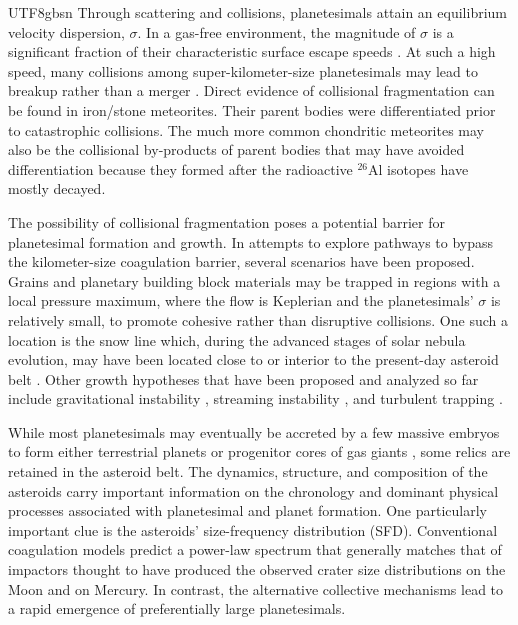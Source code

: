 \documentclass[tighten]{aastex6}
\begin{document}
\begin{CJK*}{UTF8}{gbsn}
Through scattering and collisions, planetesimals attain an 
equilibrium velocity dispersion, $\sigma$. In a gas-free environment,
the magnitude of $\sigma$ is a significant fraction of their 
characteristic surface escape speeds \citep{aarseth1993,palmer1993,  
kokuboida1998}.  At such a high speed, many collisions among 
super-kilometer-size planetesimals may lead to breakup rather 
than a merger \citep{agnor2004, leinhardt2012, stewart2012}. 
Direct evidence of collisional fragmentation can be found 
in iron/stone meteorites. Their parent bodies were 
differentiated prior to catastrophic collisions. The 
much more common chondritic meteorites may also be the 
collisional by-products of parent bodies that may have 
avoided differentiation because they formed after the 
radioactive $^{26}$Al isotopes have mostly decayed.

The possibility of collisional fragmentation poses a
potential barrier for planetesimal formation and growth.
In attempts to explore pathways to bypass the kilometer-size coagulation 
barrier, several scenarios have been proposed. Grains and 
planetary building block materials may be trapped in regions
with a local pressure maximum, where the flow is Keplerian
and the planetesimals' $\sigma$ is relatively small, to promote 
cohesive rather than disruptive collisions.  One such a 
location is the snow line \citep{kretke2007,brauer2008}
which, during the advanced stages of solar nebula evolution,
may have been located close to or interior to the present-day asteroid belt
\citep{garaudlin2007}. Other growth hypotheses that have been proposed 
and analyzed so far include gravitational instability 
\citep{goldreichward1973, weidenschillingcuzzi1993, youdinshu2002, 
garaudlin2004}, streaming instability \citep{youdingoodman2005}, 
and turbulent trapping \citep{cuzzi1993, johansen2007}. 


While most planetesimals may eventually be accreted by a 
few massive embryos to form either terrestrial planets 
or progenitor cores of gas giants \citep{idalin2004}, some 
relics are retained in the asteroid belt. The dynamics, 
structure, and composition of the asteroids carry important 
information on the chronology and dominant physical processes 
associated with planetesimal and planet formation.  One particularly 
important clue is the asteroids' size-frequency distribution 
(SFD).  Conventional coagulation models predict a power-law 
spectrum \citep{dohnanyi1969} that generally matches that 
of impactors thought to have produced the observed crater 
size distributions on the Moon and on Mercury.  In contrast, 
the alternative collective mechanisms lead to a rapid emergence 
of preferentially large planetesimals.


\end{CJK*}
\end{document}
